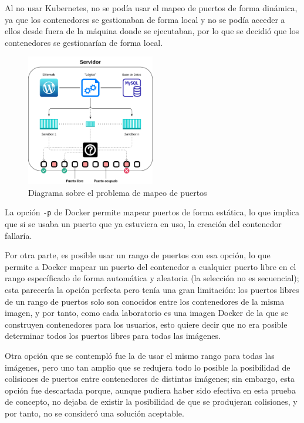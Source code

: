             Al no usar Kubernetes, no se podía usar el mapeo de puertos de forma dinámica, ya que los contenedores se gestionaban de forma local y no se podía acceder a ellos desde fuera de la máquina donde se ejecutaban, por lo que se decidió que los contenedores se gestionarían de forma local.

            \begin{figure}[htbp]
                \centering

                \includegraphics[width=0.5\textwidth]{images/Diagramas/puertos.png}
                \caption{Diagrama sobre el problema de mapeo de puertos}
                \label{fig:mapeo-puertos}
            \end{figure}

            La opción \texttt{-p} de Docker permite mapear puertos de forma estática, lo que implica que si se usaba un puerto que ya estuviera en uso, la creación del contenedor fallaría.
            
            Por otra parte, es posible usar un rango de puertos con esa opción, lo que permite a Docker mapear un puerto del contenedor a cualquier puerto libre en el rango específicado de forma automática y aleatoria (la selección no es secuencial); esta parecería la opción perfecta pero tenía una gran limitación: los puertos libres de un rango de puertos solo son conocidos entre los contenedores de la misma imagen, y por tanto, como cada laboratorio es una imagen Docker de la que se construyen contenedores para los usuarios, esto quiere decir que no era posible determinar todos los puertos libres para todas las imágenes.
            
            Otra opción que se contempló fue la de usar el mismo rango para todas las imágenes, pero uno tan amplio que se redujera todo lo posible la posibilidad de colisiones de puertos entre contenedores de distintas imágenes; sin embargo, esta opción fue descartada porque, aunque pudiera haber sido efectiva en esta prueba de concepto, no dejaba de existir la posibilidad de que se produjeran colisiones, y por tanto, no se consideró una solución aceptable.

